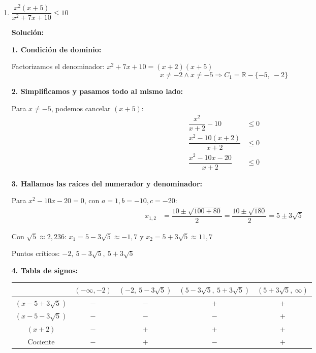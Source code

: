 \documentclass[12pt]{article}
\newcommand{\solucion}{%
    \vspace{0.8em}%
    \textbf{Solución:}%
}
\begin{document}
\begin{enumerate}[label=\alph*.-]
    \newpage
    \item $\dfrac{x^2(x+5)}{x^2+7x+10} \leq 10$

    \solucion

    \textbf{1. Condición de dominio:}

    Factorizamos el denominador: $x^2 + 7x + 10 = (x+2)(x+5)$
    \[
    x \neq -2 \land x \neq -5 \Rightarrow C_1 = \mathbb{R} - \{-5,\ -2\}
    \]

    \textbf{2. Simplificamos y pasamos todo al mismo lado:}

    Para $x \neq -5$, podemos cancelar $(x+5)$:
    \begin{align*}
    \dfrac{x^2}{x+2} - 10 &\leq 0 \\[0.3em]
    \dfrac{x^2 - 10(x+2)}{x+2} &\leq 0 \\[0.3em]
    \dfrac{x^2 - 10x - 20}{x+2} &\leq 0
    \end{align*}

    \textbf{3. Hallamos las raíces del numerador y denominador:}

    Para $x^2 - 10x - 20 = 0$, con $a=1, b=-10, c=-20$:
    \begin{align*}
    x_{1,2} &= \dfrac{10 \pm \sqrt{100 + 80}}{2} = \dfrac{10 \pm \sqrt{180}}{2} = 5 \pm 3\sqrt{5}
    \end{align*}

    Con $\sqrt{5} \approx 2{,}236$: \quad $x_1 = 5 - 3\sqrt{5} \approx -1{,}7$ \quad y \quad $x_2 = 5 + 3\sqrt{5} \approx 11{,}7$

    Puntos críticos: $-2,\ 5-3\sqrt{5},\ 5+3\sqrt{5}$

    \textbf{4. Tabla de signos:}

    \begin{center}
    \begin{tabular}{|c|c|c|c|c|}
    \hline
    & $(-\infty,-2)$ & $(-2,\ 5-3\sqrt{5})$ & $(5-3\sqrt{5},\ 5+3\sqrt{5})$ & $(5+3\sqrt{5},\ \infty)$ \\
    \hline
    $(x-5+3\sqrt{5})$ & $-$ & $-$ & $+$ & $+$ \\
    \hline
    $(x-5-3\sqrt{5})$ & $-$ & $-$ & $-$ & $+$ \\
    \hline
    $(x+2)$ & $-$ & $+$ & $+$ & $+$ \\
    \hline
    Cociente & $-$ & $+$ & $-$ & $+$ \\
    \hline
    \end{tabular}
    \end{center}


\end{enumerate}
\end{document}
